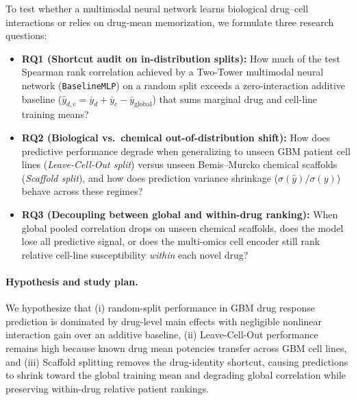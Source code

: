 \documentclass{article}
\begin{document}
To test whether a multimodal neural network learns biological drug--cell interactions or relies on drug-mean memorization, we formulate three research questions:
\begin{itemize}
  \setlength{\itemsep}{1pt}\setlength{\parskip}{0pt}\setlength{\topsep}{2pt}
  \item \textbf{RQ1 (Shortcut audit on in-distribution splits):} How much of the test Spearman rank correlation achieved by a Two-Tower multimodal neural network (\texttt{BaselineMLP}) on a random split exceeds a zero-interaction additive baseline ($\hat{y}_{d,c} = \bar{y}_d + \bar{y}_c - \bar{y}_{\text{global}}$) that sums marginal drug and cell-line training means?
  \item \textbf{RQ2 (Biological vs.\ chemical out-of-distribution shift):} How does predictive performance degrade when generalizing to unseen GBM patient cell lines (\emph{Leave-Cell-Out split}) versus unseen Bemis--Murcko chemical scaffolds (\emph{Scaffold split}), and how does prediction variance shrinkage ($\sigma(\hat{y})/\sigma(y)$) behave across these regimes?
  \item \textbf{RQ3 (Decoupling between global and within-drug ranking):} When global pooled correlation drops on unseen chemical scaffolds, does the model lose all predictive signal, or does the multi-omics cell encoder still rank relative cell-line susceptibility \emph{within} each novel drug?
\end{itemize}

\paragraph{Hypothesis and study plan.}
We hypothesize that (i) random-split performance in GBM drug response prediction is dominated by drug-level main effects with negligible nonlinear interaction gain over an additive baseline, (ii) Leave-Cell-Out performance remains high because known drug mean potencies transfer across GBM cell lines, and (iii) Scaffold splitting removes the drug-identity shortcut, causing predictions to shrink toward the global training mean and degrading global correlation while preserving within-drug relative patient rankings.
\end{document}
